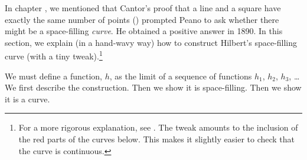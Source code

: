 \documentclass[../../../include/open-logic-section]{subfiles}
\begin{document}


In chapter , we mentioned that Cantor's proof that
a line and a square have exactly the same number of points
() prompted Peano to
ask whether there might be a space-filling \emph{curve}. He obtained a
positive answer in 1890. In this section, we explain (in a
hand-wavy way) how to construct Hilbert's space-filling curve (with a
tiny tweak).\footnote{For a more rigorous explanation, see
\cite{RoseUnpublished}. The tweak amounts to the inclusion of the red
parts of the curves below. This makes it slightly easier to check that
the curve is continuous.}

We must define a function, $h$, as the limit of a sequence of functions $h_1$, $h_2$, $h_3$, \dots\@ We first describe the construction. Then we show it is space-filling. Then we show it is a curve. 
\end{document}

